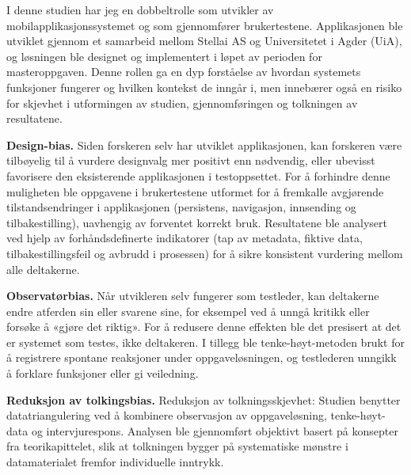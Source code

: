 I denne studien har jeg en dobbeltrolle som utvikler av mobilapplikasjonssystemet og som gjennomfører brukertestene. Applikasjonen ble utviklet gjennom et samarbeid mellom Stellai AS og Universitetet i Agder (UiA), og løsningen ble designet og implementert i løpet av perioden for masteroppgaven. Denne rollen ga en dyp forståelse av hvordan systemets funksjoner fungerer og hvilken kontekst de inngår i, men innebærer også en risiko for skjevhet i utformingen av studien, gjennomføringen og tolkningen av resultatene.

\textbf{Design-bias.}
Siden forskeren selv har utviklet applikasjonen, kan forskeren være tilbøyelig til å vurdere designvalg mer positivt enn nødvendig, eller ubevisst favorisere den eksisterende applikasjonen i testoppsettet. For å forhindre denne muligheten ble oppgavene i brukertestene utformet for å fremkalle avgjørende tilstandsendringer i applikasjonen (persistens, navigasjon, innsending og tilbakestilling), uavhengig av forventet korrekt bruk. Resultatene ble analysert ved hjelp av forhåndsdefinerte indikatorer (tap av metadata, fiktive data, tilbakestillingsfeil og avbrudd i prosessen) for å sikre konsistent vurdering mellom alle deltakerne.

\textbf{Observatørbias.}
Når utvikleren selv fungerer som testleder, kan deltakerne endre atferden sin eller svarene sine, for eksempel ved å unngå kritikk eller forsøke å «gjøre det riktig». For å redusere denne effekten ble det presisert at det er systemet som testes, ikke deltakeren. I tillegg ble tenke-høyt-metoden brukt for å registrere spontane reaksjoner under oppgaveløsningen, og testlederen unngikk å forklare funksjoner eller gi veiledning.

\textbf{Reduksjon av tolkingsbias.}
Reduksjon av tolkningsskjevhet: Studien benytter datatriangulering ved å kombinere observasjon av oppgaveløsning, tenke-høyt-data og intervju­respons. Analysen ble gjennomført objektivt basert på konsepter fra teorikapittelet, slik at tolkningen bygger på systematiske mønstre i datamaterialet fremfor individuelle inntrykk.


